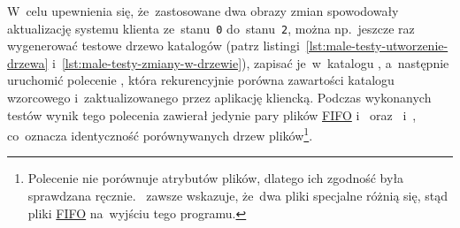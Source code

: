 \documentclass[thesis]{subfiles}
\begin{document}
W~celu upewnienia się, że~zastosowane dwa obrazy zmian spowodowały aktualizację systemu klienta ze~stanu~\texttt{0} do~stanu~\texttt{2}, można np.~jeszcze raz wygenerować testowe drzewo katalogów (patrz listingi~\ref{lst:male-testy-utworzenie-drzewa} i~\ref{lst:male-testy-zmiany-w-drzewie}), zapisać je~w~katalogu , a~następnie uruchomić polecenie , która rekurencyjnie porówna zawartości katalogu wzorcowego i~zaktualizowanego przez aplikację kliencką. Podczas wykonanych testów wynik tego polecenia zawierał jedynie pary plików \href{https://en.wikipedia.org/wiki/Named_pipe}{FIFO}  i~ oraz~ i~, co~oznacza identyczność porównywanych drzew plików\footnote{Polecenie  nie porównuje atrybutów plików, dlatego ich zgodność była sprawdzana ręcznie. ~zawsze wskazuje, że~dwa pliki specjalne różnią się, stąd pliki \href{https://en.wikipedia.org/wiki/Named_pipe}{FIFO} na~wyjściu tego programu.}.
\end{document}
